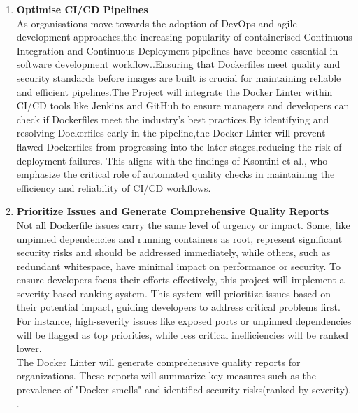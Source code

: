 \begin{enumerate}
    \item \textbf{Optimise CI/CD Pipelines}\\As organisations move towards the adoption of DevOps and agile development approaches,the increasing popularity of containerised Continuous Integration and Continuous Deployment pipelines have become essential in software development workflow.\cite{DevSecOpsCI/CDPipeline}.Ensuring that Dockerfiles meet quality and security standards before images are built is crucial for maintaining reliable and efficient pipelines.The Project will integrate the Docker Linter within CI/CD tools like Jenkins and GitHub to ensure managers and developers can check if Dockerfiles meet the industry's best practices.By identifying and resolving Dockerfiles early in the pipeline,the Docker Linter will prevent flawed Dockerfiles from progressing into the later stages,reducing the risk of deployment failures. This aligns with the findings of Ksontini et al., who emphasize the critical role of automated quality checks in maintaining the efficiency and reliability of CI/CD workflows. 

    \item \textbf{Prioritize Issues and Generate Comprehensive Quality Reports}\\Not all Dockerfile issues carry the same level of urgency or impact. Some, like unpinned dependencies and running containers as root, represent significant security risks and should be addressed immediately, while others, such as redundant whitespace, have minimal impact on performance or security. To ensure developers focus their efforts effectively, this project will implement a severity-based ranking system. This system will prioritize issues based on their potential impact, guiding developers to address critical problems first. For instance, high-severity issues like exposed ports or unpinned dependencies will be flagged as top priorities, while less critical inefficiencies will be ranked lower.
    \\The Docker Linter will generate comprehensive quality reports for organizations. These reports will summarize key measures such as the prevalence of "Docker smells" and identified security risks(ranked by severity). .

\end{enumerate}

